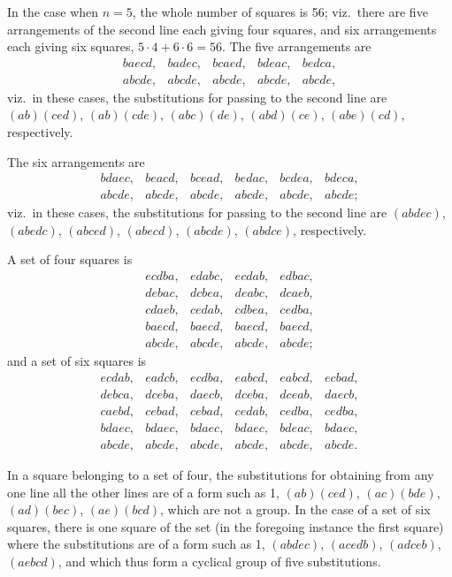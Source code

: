 \documentclass[11pt,a4paper]{article}
\begin{document}
In the case when $n = 5$, the whole number of squares is 56; viz.\ there are five arrangements of the second line each giving four squares, and six arrangements each giving six squares, $5 \cdot 4 + 6 \cdot 6 = 56$. The five arrangements are
\[
\begin{array}{ccccc}
baecd, & badec, & bcaed, & bdeac, & bedca,\\
abcde, & abcde, & abcde, & abcde, & abcde,
\end{array}
\]
viz.\ in these cases, the substitutions for passing to the second line are $(ab)(ced)$, $(ab)(cde)$, $(abc)(de)$, $(abd)(ce)$, $(abe)(cd)$, respectively.

The six arrangements are
\[
\begin{array}{cccccc}
bdaec, & beacd, & bcead, & bedac, & bcdea, & bdeca,\\
abcde, & abcde, & abcde, & abcde, & abcde, & abcde;
\end{array}
\]
viz.\ in these cases, the substitutions for passing to the second line are $(abdec)$, $(abedc)$, $(abced)$, $(abecd)$, $(abcde)$, $(abdce)$, respectively.

A set of four squares is
\[
\begin{array}{cccc}
ecdba, & edabc, & ecdab, & edbac,\\
debac, & dcbea, & deabc, & dcaeb,\\
cdaeb, & cedab, & cdbea, & cedba,\\
baecd, & baecd, & baecd, & baecd,\\
abcde, & abcde, & abcde, & abcde;
\end{array}
\]
and a set of six squares is
\[
\begin{array}{cccccc}
ecdab, & eadcb, & ecdba, & eabcd, & eabcd, & ecbad,\\
debca, & dceba, & daecb, & dceba, & dceab, & daecb,\\
caebd, & cebad, & cebad, & cedab, & cedba, & cedba,\\
bdaec, & bdaec, & bdaec, & bdaec, & bdeac, & bdaec,\\
abcde, & abcde, & abcde, & abcde, & abcde, & abcde.
\end{array}
\]

In a square belonging to a set of four, the substitutions for obtaining from any one line all the other lines are of a form such as 1, $(ab)(ced)$, $(ac)(bde)$, $(ad)(bec)$, $(ae)(bcd)$, which are not a group. In the case of a set of six squares, there is one square of the set (in the foregoing instance the first square) where the substitutions are of a form such as 1, $(abdec)$, $(acedb)$, $(adceb)$, $(aebcd)$, and which thus form a cyclical group of five substitutions.
\end{document}
